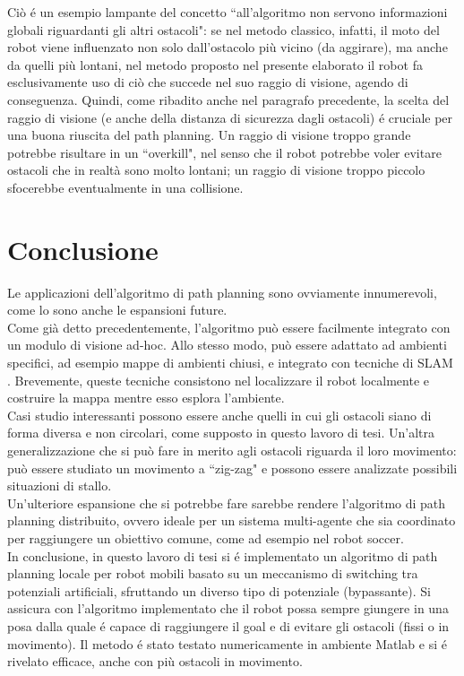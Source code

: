 \documentclass[14pt,a4paper]{extarticle}
\begin{document}
Ciò é un esempio lampante del concetto ``all'algoritmo non servono informazioni globali riguardanti gli altri ostacoli": se nel metodo classico, infatti, il moto del robot viene influenzato non solo dall'ostacolo più vicino (da aggirare), ma anche da quelli più lontani, nel metodo proposto nel presente elaborato il robot fa esclusivamente uso di ciò che succede nel suo raggio di visione, agendo di conseguenza. Quindi, come ribadito anche nel paragrafo precedente, la scelta del raggio di visione (e anche della distanza di sicurezza dagli ostacoli) é cruciale per una buona riuscita del path planning. Un raggio di visione troppo grande potrebbe risultare in un ``overkill", nel senso che il robot potrebbe voler evitare ostacoli che in realtà sono molto lontani; un raggio di visione troppo piccolo sfocerebbe eventualmente in una collisione.
\newpage
\section{Conclusione}
Le applicazioni dell'algoritmo di path planning sono ovviamente innumerevoli, come lo sono anche le espansioni future.\\
Come già detto precedentemente, l'algoritmo può essere facilmente integrato con un modulo di visione ad-hoc. Allo stesso modo, può essere adattato ad ambienti specifici, ad esempio mappe di ambienti chiusi, e integrato con tecniche di SLAM \cite{slam}. Brevemente, queste tecniche consistono nel localizzare il robot localmente e costruire la mappa mentre esso esplora l'ambiente. \\
Casi studio interessanti possono essere anche quelli in cui gli ostacoli siano di forma diversa e non circolari, come supposto in questo lavoro di tesi. Un'altra generalizzazione che si può fare in merito agli ostacoli riguarda il loro movimento: può essere studiato un movimento a ``zig-zag" e possono essere analizzate possibili situazioni di stallo.\\
Un'ulteriore espansione che si potrebbe fare sarebbe rendere l'algoritmo di path planning distribuito, ovvero ideale per un sistema multi-agente che sia coordinato per raggiungere un obiettivo comune, come ad esempio nel robot soccer.\\
In conclusione, in questo lavoro di tesi si é implementato un algoritmo di path planning locale per robot mobili basato su un meccanismo di switching tra potenziali artificiali, sfruttando un diverso tipo di potenziale (bypassante). Si assicura con l'algoritmo implementato che il robot possa sempre giungere in una posa dalla quale é capace di raggiungere il goal e di evitare gli ostacoli (fissi o in movimento). Il metodo é stato testato numericamente in ambiente Matlab e si é rivelato efficace, anche con più ostacoli in movimento.

\newpage \lstlistoflistings
\newpage \listoffigures \printbibliography
\end{document}
